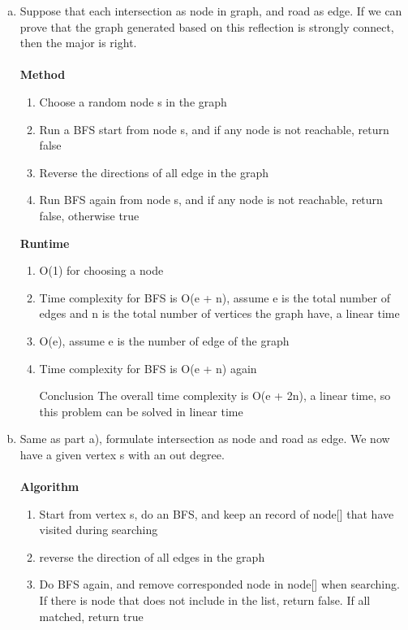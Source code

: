 \documentclass{article}
\begin{document}
\begin{enumerate}[a)]
    \item Suppose that each intersection as node in graph, and road as edge. If we can prove that the graph generated based on this reflection is strongly connect, then the major is right. \\\\
    \textbf{Method}
    \begin{enumerate}[Step 1]
        \item Choose a random node s in the graph
        \item Run a BFS start from node s, and if any node is not reachable, return false
        \item Reverse the directions of all edge in the graph
        \item Run BFS again from node s, and if any node is not reachable, return false, otherwise true
    \end{enumerate}
    \textbf{Runtime}
    \begin{enumerate}[Step 1]
        \item O(1) for choosing a node
        \item Time complexity for BFS is O(e + n), assume e is the total number of edges and n is the total number of vertices the graph have, a linear time
        \item O(e), assume e is the number of edge of the graph
        \item Time complexity for BFS is O(e + n) again
        \item [Conclusion] The overall time complexity is O(e + 2n), a linear time, so this problem can be solved in linear time
    \end{enumerate}
    \item Same as part a), formulate intersection as node and road as edge. We now have a given vertex s with an out degree. \\\\
    \textbf{Algorithm}
    \begin{enumerate}[Step 1]
        \item Start from vertex s, do an BFS, and keep an record of node[] that have visited during searching
        \item reverse the direction of all edges in the graph
        \item Do BFS again, and remove corresponded node in node[] when searching. If there is node that does not include in the list, return false. If all matched, return true

\end{enumerate}
\end{enumerate}
\end{document}
